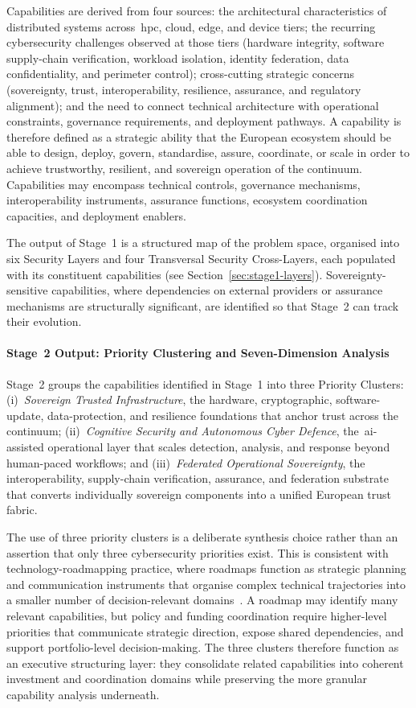 \documentclass{ieeeaccess}
\begin{document}
Capabilities are derived from four sources: the architectural characteristics of distributed systems across~\gls{hpc}, cloud, edge, and device tiers; the recurring cybersecurity challenges observed at those tiers (hardware integrity, software supply-chain verification, workload isolation, identity federation, data confidentiality, and perimeter control); cross-cutting strategic concerns (sovereignty, trust, interoperability, resilience, assurance, and regulatory alignment); and the need to connect technical architecture with operational constraints, governance requirements, and deployment pathways. A capability is therefore defined as a strategic ability that the European ecosystem should be able to design, deploy, govern, standardise, assure, coordinate, or scale in order to achieve trustworthy, resilient, and sovereign operation of the continuum. Capabilities may encompass technical controls, governance mechanisms, interoperability instruments, assurance functions, ecosystem coordination capacities, and deployment enablers.

The output of Stage~1 is a structured map of the problem space, organised into six Security Layers and four Transversal Security Cross-Layers, each populated with its constituent capabilities (see Section~\ref{sec:stage1-layers}). Sovereignty-sensitive capabilities, where dependencies on external providers or assurance mechanisms are structurally significant, are identified so that Stage~2 can track their evolution.

\paragraph{Stage~2 Output: Priority Clustering and Seven-Dimension Analysis}
Stage~2 groups the capabilities identified in Stage~1 into three Priority Clusters: (i)~\emph{Sovereign Trusted Infrastructure}, the hardware, cryptographic, software-update, data-protection, and resilience foundations that anchor trust across the continuum; (ii)~\emph{Cognitive Security and Autonomous Cyber Defence}, the~\gls{ai}-assisted operational layer that scales detection, analysis, and response beyond human-paced workflows; and (iii)~\emph{Federated Operational Sovereignty}, the interoperability, supply-chain verification, assurance, and federation substrate that converts individually sovereign components into a unified European trust fabric.

The use of three priority clusters is a deliberate synthesis choice rather than an assertion that only three cybersecurity priorities exist. This is consistent with technology-roadmapping practice, where roadmaps function as strategic planning and communication instruments that organise complex technical trajectories into a smaller number of decision-relevant domains~\cite{phaal2004roadmapping}. A roadmap may identify many relevant capabilities, but policy and funding coordination require higher-level priorities that communicate strategic direction, expose shared dependencies, and support portfolio-level decision-making. The three clusters therefore function as an executive structuring layer: they consolidate related capabilities into coherent investment and coordination domains while preserving the more granular capability analysis underneath.
\end{document}
